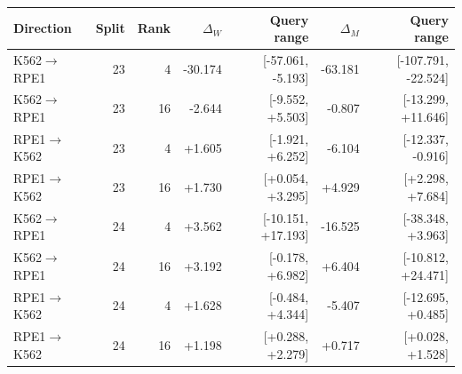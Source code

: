 \begin{tabular}{lrrrrrr}
\toprule
Direction & Split & Rank & $\Delta_W$ & Query range & $\Delta_M$ & Query range \\
\midrule
K562$\to$RPE1 & 23 & 4 & -30.174 & [-57.061, -5.193] & -63.181 & [-107.791, -22.524] \\
K562$\to$RPE1 & 23 & 16 & -2.644 & [-9.552, +5.503] & -0.807 & [-13.299, +11.646] \\
RPE1$\to$K562 & 23 & 4 & +1.605 & [-1.921, +6.252] & -6.104 & [-12.337, -0.916] \\
RPE1$\to$K562 & 23 & 16 & +1.730 & [+0.054, +3.295] & +4.929 & [+2.298, +7.684] \\
K562$\to$RPE1 & 24 & 4 & +3.562 & [-10.151, +17.193] & -16.525 & [-38.348, +3.963] \\
K562$\to$RPE1 & 24 & 16 & +3.192 & [-0.178, +6.982] & +6.404 & [-10.812, +24.471] \\
RPE1$\to$K562 & 24 & 4 & +1.628 & [-0.484, +4.344] & -5.407 & [-12.695, +0.485] \\
RPE1$\to$K562 & 24 & 16 & +1.198 & [+0.288, +2.279] & +0.717 & [+0.028, +1.528] \\
\bottomrule
\end{tabular}
